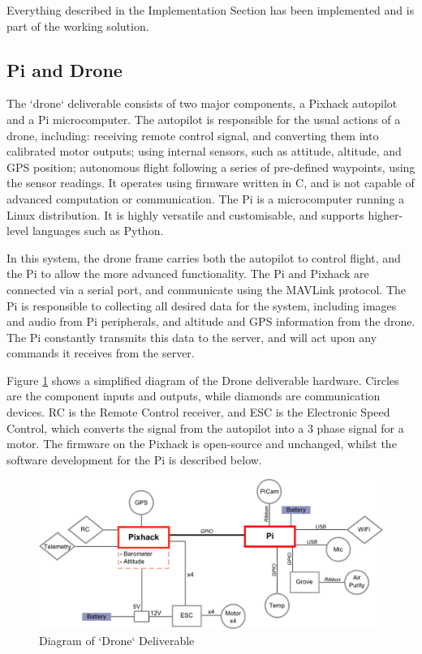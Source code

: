 \documentclass{article}
\begin{document}
 Everything described in the Implementation Section has been implemented and is part of the working solution. 
 
\subsection{Pi and Drone}
The `drone` deliverable consists of two major components, a Pixhack autopilot and a Pi microcomputer. The autopilot is responsible for the usual actions of a drone, including: receiving remote control signal, and converting them into calibrated motor outputs; using internal sensors, such as attitude, altitude, and GPS position; autonomous flight following a series of pre-defined waypoints, using the sensor readings. It operates using firmware written in C, and is not capable of advanced computation or communication. The Pi is a microcomputer running a Linux distribution. It is highly versatile and customisable, and supports higher-level languages such as Python. 

In this system, the drone frame carries both the autopilot to control flight, and the Pi to allow the more advanced functionality. The Pi and Pixhack are connected via a serial port, and communicate using the MAVLink protocol. The Pi is responsible to collecting all desired data for the system, including images and audio from Pi peripherals, and altitude and GPS information from the drone. The Pi constantly transmits this data to the server, and will act upon any commands it receives from the server.

Figure \ref{fig:DroneDiagram} shows a simplified diagram of the Drone deliverable hardware. Circles are the component inputs and outputs, while diamonds are communication devices. RC is the Remote Control receiver, and ESC is the Electronic Speed Control, which converts the signal from the autopilot into a 3 phase signal for a motor. The firmware on the Pixhack is open-source and unchanged, whilst the software development for the Pi is described below.

\begin{figure}[h]
\centering
\caption{Diagram of `Drone` Deliverable\label{fig:DroneDiagram}}
\includegraphics[width=\textwidth]{DroneDiagram}
\end{figure}
\end{document}
